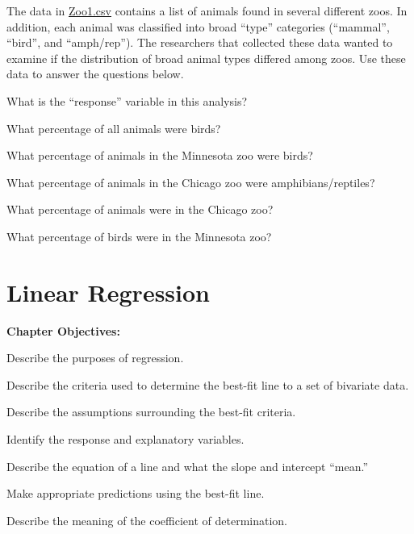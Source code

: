 \documentclass[10pt,openany]{book}\usepackage[]{graphicx}\usepackage[]{color}
\begin{document}
\begin{exsection}
  \item \label{revex:cbEDAZoo1} \rhw{} The data in \href{}{Zoo1.csv} contains a list of animals found in several different zoos.  In addition, each animal was classified into broad ``type'' categories (``mammal'', ``bird'', and ``amph/rep'').  The researchers that collected these data wanted to examine if the distribution of broad animal types differed among zoos.  Use these data to answer the questions below.
  \begin{Enumerate}
    \item What is the ``response'' variable in this analysis?
    \item What percentage of all animals were birds?
    \item What percentage of animals in the Minnesota zoo were birds?
    \item What percentage of animals in the Chicago zoo were amphibians/reptiles?
    \item What percentage of animals were in the Chicago zoo?
    \item What percentage of birds were in the Minnesota zoo?
  \end{Enumerate}
\end{exsection}



\chapter{Linear Regression}  \label{chap:Regress}
\begin{ChapObj}{\boxwidth}
  \textbf{Chapter Objectives:}
  \begin{Enumerate}
    \item Describe the purposes of regression.
    \item Describe the criteria used to determine the best-fit line to a set of bivariate data.
    \item Describe the assumptions surrounding the best-fit criteria.
    \item Identify the response and explanatory variables.
    \item Describe the equation of a line and what the slope and intercept ``mean.''
    \item Make appropriate predictions using the best-fit line.
    \item Describe the meaning of the coefficient of determination.
  \end{Enumerate}
\end{ChapObj}
\end{document}
